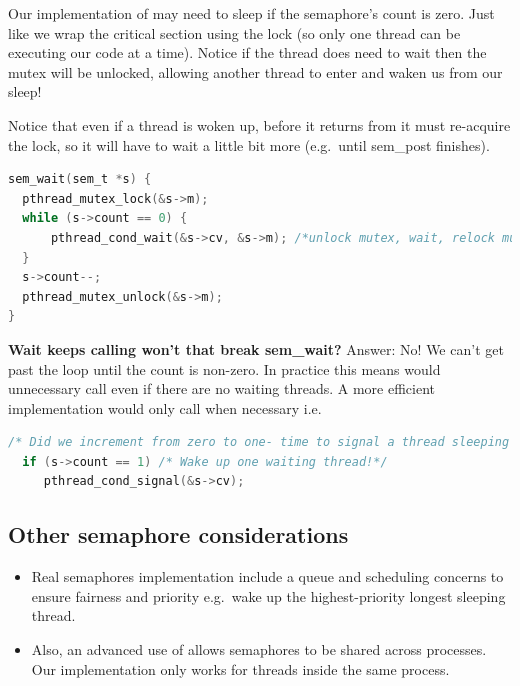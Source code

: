 Our implementation of  may need to sleep if the semaphore's count is zero. Just like  we wrap the critical section using the lock (so only one thread can be executing our code at a time). Notice if the thread does need to wait then the mutex will be unlocked, allowing another thread to enter  and waken us from our sleep!

Notice that even if a thread is woken up, before it returns from  it must re-acquire the lock, so it will have to wait a little bit more (e.g.~until sem\_post finishes).

\begin{lstlisting}[language=C]
sem_wait(sem_t *s) {
  pthread_mutex_lock(&s->m);
  while (s->count == 0) {
      pthread_cond_wait(&s->cv, &s->m); /*unlock mutex, wait, relock mutex*/
  }
  s->count--;
  pthread_mutex_unlock(&s->m);
}
\end{lstlisting}

\textbf{Wait  keeps calling  won't that break sem\_wait?} Answer: No! We can't get past the loop until the count is non-zero. In practice this means  would unnecessary call  even if there are no waiting threads. A more efficient implementation would only call  when necessary i.e.

\begin{lstlisting}[language=C]
  /* Did we increment from zero to one- time to signal a thread sleeping inside sem_post */
  if (s->count == 1) /* Wake up one waiting thread!*/
     pthread_cond_signal(&s->cv);
\end{lstlisting}

\subsection{Other semaphore considerations}\label{other-semaphore-considerations}

\begin{itemize}
\tightlist
\item
  Real semaphores implementation include a queue and scheduling concerns to ensure fairness and priority e.g.~wake up the highest-priority longest sleeping thread.
\item
  Also, an advanced use of  allows semaphores to be shared across processes. Our implementation only works for threads inside the same process.
\end{itemize}

